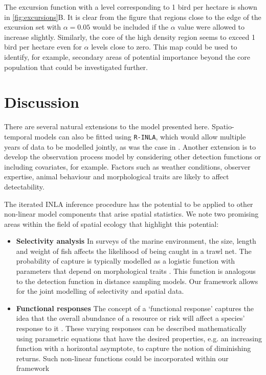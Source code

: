 \documentclass{statsoc}
\begin{document}
The excursion function with a level corresponding to 1 bird per hectare is shown in \autoref{fig:excursions}B.  It is clear from the figure that regions close to the edge of the excursion set with $\alpha = 0.05$ would be included if the $\alpha$ value were allowed to increase slightly.  Similarly, the core of the high density region seems to exceed 1 bird per hectare even for $\alpha$ levels close to zero. This map could be used to identify, for example, secondary areas of potential importance beyond the core population that could be investigated further.

\section{Discussion}
\label{sec-discussion}

There are several natural extensions to the model presented here.  Spatio-temporal models can also be fitted using \texttt{R-INLA}, which would allow multiple years of data to be modelled jointly, as was the case in \cite{camp_dsm_2020}.  Another extension is to develop the observation process model by considering other detection functions or including covariates, for example.  Factors such as weather conditions, observer expertise, animal behaviour and morphological traits are likely to affect detectability.

The iterated INLA inference procedure has the potential to be applied to other non-linear model components that arise spatial statistics.  We note two promising areas within the field of spatial ecology that highlight this potential: 

\begin{itemize}
	\item \textbf{Selectivity analysis} In surveys of the marine environment, the size, length and weight of fish affects the likelihood of being caught in a trawl net.  The probability of capture is typically modelled as a logistic function with parameters that depend on morphological traits \citep{herrmann_understanding_2016, madsen_selectivity_2007, galbraith_demersal_1994}.  This function is analogous to the detection function in distance sampling models.  Our framework allows for the joint modelling of selectivity and spatial data.
	\item \textbf{Functional responses} The concept of a `functional response' captures the idea that the overall abundance of a resource or risk will affect a species' response to it \citep{holling_some_1959}.  These varying responses can be described mathematically using parametric equations that have the desired properties, e.g. an increasing function with a horizontal asymptote, to capture the notion of diminishing returns.  Such non-linear functions could be incorporated within our framework
\end{itemize}
\end{document}
